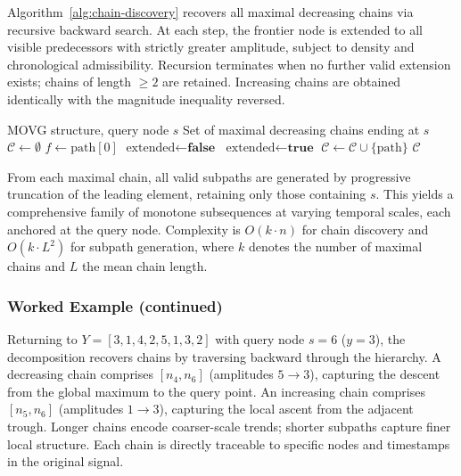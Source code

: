 \documentclass[a4paper,12pt]{article}
\begin{document}
Algorithm~\ref{alg:chain-discovery} recovers all maximal decreasing chains via recursive backward search. At each step, the frontier node is extended to all visible predecessors with strictly greater amplitude, subject to density and chronological admissibility. Recursion terminates when no further valid extension exists; chains of length $\geq 2$ are retained. Increasing chains are obtained identically with the magnitude inequality reversed.

\begin{algorithm}[H]
\caption{Find Maximal Decreasing Chains}
\label{alg:chain-discovery}
\begin{algorithmic}[1]
\Require MOVG structure, query node $s$
\Ensure Set of maximal decreasing chains ending at $s$
    \State $\mathcal{C} \gets \emptyset$
        \State $f \gets \text{path}[0]$ 
        \State $\text{extended} \gets \textbf{false}$
                \State {}
                \State $\text{extended} \gets \textbf{true}$
            \EndIf
        \EndFor
            \State $\mathcal{C} \gets \mathcal{C} \cup \{\text{path}\}$
        \EndIf
    \EndProcedure
    \State {}
    \State \Return $\mathcal{C}$
\EndFunction
\end{algorithmic}
\end{algorithm}

From each maximal chain, all valid subpaths are generated by progressive truncation of the leading element, retaining only those containing $s$. This yields a comprehensive family of monotone subsequences at varying temporal scales, each anchored at the query node. Complexity is $O(k \cdot n)$ for chain discovery and $O(k \cdot L^2)$ for subpath generation, where $k$ denotes the number of maximal chains and $L$ the mean chain length.

\subsubsection{Worked Example (continued)}

Returning to $Y = [3, 1, 4, 2, 5, 1, 3, 2]$ with query node $s = 6$ ($y{=}3$), the decomposition recovers chains by traversing backward through the hierarchy. A decreasing chain comprises $[n_4, n_6]$ (amplitudes $5 \to 3$), capturing the descent from the global maximum to the query point. An increasing chain comprises $[n_5, n_6]$ (amplitudes $1 \to 3$), capturing the local ascent from the adjacent trough. Longer chains encode coarser-scale trends; shorter subpaths capture finer local structure. Each chain is directly traceable to specific nodes and timestamps in the original signal.
\end{document}
